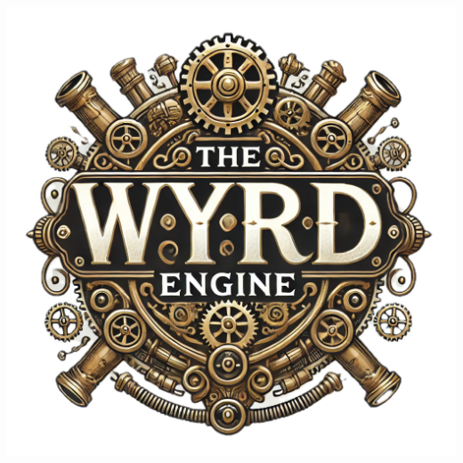 \documentclass[nodeprecatedcode,bg=print]{dndbook}
\begin{document}
\frontmatter
\thispagestyle{empty}
\begin{center}
  \includegraphics[width=\textwidth]{img/wyrd-logo}
\end{center}
\newpage
\end{document}
